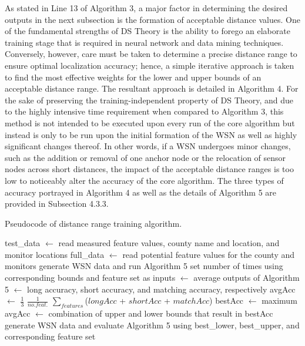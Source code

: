 \documentclass[12pt]{uthesis-v12}  %
\renewcommand{\arraystretch}{1.2}
\begin{document}
As stated in Line 13 of Algorithm 3, a major factor in determining the desired outputs in the next subsection is the formation of acceptable distance values. One of the fundamental strengths of DS Theory is the ability to forego an elaborate training stage that is required in neural network and data mining techniques. Conversely, however, care must be taken to determine a precise distance range to ensure optimal localization accuracy; hence, a simple iterative approach is taken to find the most effective weights for the lower and upper bounds of an acceptable distance range. The resultant approach is detailed in Algorithm 4. For the sake of preserving the training-independent property of DS Theory, and due to the highly intensive time requirement when compared to Algorithm 3, this method is not intended to be executed upon every run of the core algorithm but instead is only to be run upon the initial formation of the WSN as well as highly significant changes thereof. In other words, if a WSN undergoes minor changes, such as the addition or removal of one anchor node or the relocation of sensor nodes across short distances, the impact of the acceptable distance ranges is too low to noticeably alter the accuracy of the core algorithm. The three types of accuracy portrayed in Algorithm 4 as well as the details of Algorithm 5 are provided in Subsection 4.3.3.

\begin{algorithm}
\caption{Pseudocode of distance range training algorithm.} \label{alg-train}
\renewcommand{\arraystretch}{1.3}
\begin{algorithmic}[1]
\STATE test\_data $\leftarrow$ read measured feature values, county name and location, and monitor locations
\STATE full\_data $\leftarrow$ read potential feature values for the county and monitors
			\STATE generate WSN data and run Algorithm 5 set number of times using corresponding bounds and feature set as inputs
			 $\leftarrow$ average outputs of Algorithm 5
			 $\leftarrow$ long accuracy, short accuracy, and matching accuracy, respectively
		\ENDFOR
		\STATE avgAcc $\leftarrow$ $\frac{1}{3}$ $\frac{1}{no. feat.}$ $\sum\nolimits_{features}$($longAcc$ + $shortAcc$ + $matchAcc$)
	\ENDFOR
\ENDFOR
\STATE  bestAcc $\leftarrow$ maximum avgAcc
 $\leftarrow$ combination of upper and lower bounds that result in bestAcc
	\STATE generate WSN data and evaluate Algorithm 5 using best\_lower, best\_upper, and corresponding feature set
\ENDFOR

\label{dst}
\end{algorithmic}
\end{algorithm}
\end{document}
